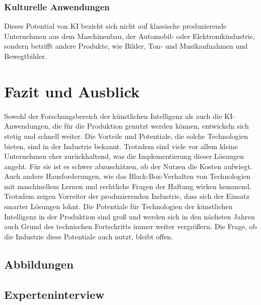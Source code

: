 \documentclass[a4paper,12pt, german]{report}
\begin{document}
\subsection{Kulturelle Anwendungen}
Dieses Potential von KI bezieht sich nicht auf klassische produzierende Unternehmen aus dem Maschinenbau, der Automobil- oder Elektronikindustrie, sondern betrifft andere Produkte, wie Bilder, Ton- und Musikaufnahmen und Bewegtbilder. 


\chapter{Fazit und Ausblick}

Sowohl der Forschungsbereich der künstlichen Intelligenz als auch die KI-Anwendungen, die für die Produktion genutzt werden können, entwickeln sich stetig und schnell weiter. Die Vorteile und Potentiale, die solche Technologien bieten, sind in der Industrie bekannt. Trotzdem sind viele vor allem kleine Unternehmen eher zurückhaltend, was die Implementierung dieser Lösungen angeht. Für sie ist es schwer abzuschätzen, ob der Nutzen die Kosten aufwiegt. Auch andere Hausforderungen, wie das Black-Box-Verhalten von Technologien mit maschinellem Lernen und rechtliche Fragen der Haftung wirken hemmend. Trotzdem zeigen Vorreiter der produzierenden Industrie, dass sich der Einsatz smarter Lösungen lohnt. Die Potentiale für Technologien der künstlichen Intelligenz in der Produktion sind groß und werden sich in den nächsten Jahren auch Grund des technischen Fortschritts immer weiter vergrößern. Die Frage, ob die Industrie diese Potentiale auch nutzt, bleibt offen.

\listoffigures

\clearpage




\appendix
\section{Abbildungen}



\section{Experteninterview}
\end{document}
